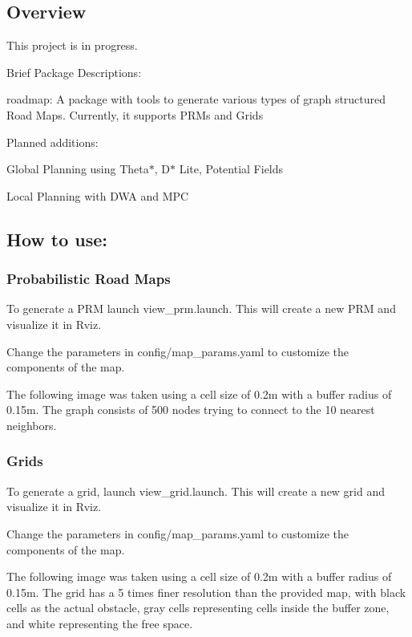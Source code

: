 \subsection*{Overview}

This project is in progress.

Brief Package Descriptions\+:
\begin{DoxyItemize}
\item {\ttfamily roadmap}\+: A package with tools to generate various types of graph structured Road Maps. Currently, it supports P\+R\+Ms and Grids
\end{DoxyItemize}

Planned additions\+:
\begin{DoxyItemize}
\item Global Planning using Theta$\ast$, D$\ast$ Lite, Potential Fields
\item Local Planning with D\+WA and M\+PC
\end{DoxyItemize}

\subsection*{How to use\+:}

\subsubsection*{Probabilistic Road Maps}

To generate a P\+RM launch {\ttfamily view\+\_\+prm.\+launch}. This will create a new P\+RM and visualize it in Rviz.

Change the parameters in {\ttfamily config/map\+\_\+params.\+yaml} to customize the components of the map.

The following image was taken using a cell size of 0.\+2m with a buffer radius of 0.\+15m. The graph consists of 500 nodes trying to connect to the 10 nearest neighbors.  \subsubsection*{Grids}

To generate a grid, launch {\ttfamily view\+\_\+grid.\+launch}. This will create a new grid and visualize it in Rviz.

Change the parameters in {\ttfamily config/map\+\_\+params.\+yaml} to customize the components of the map.

The following image was taken using a cell size of 0.\+2m with a buffer radius of 0.\+15m. The grid has a 5 times finer resolution than the provided map, with black cells as the actual obstacle, gray cells representing cells inside the buffer zone, and white representing the free space.


